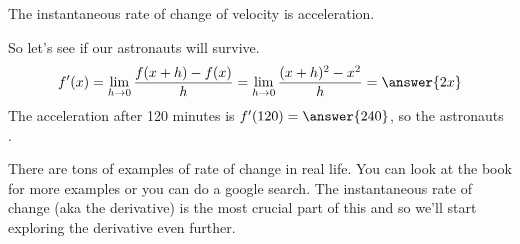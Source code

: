 \documentclass{ximera}
\begin{document}
The instantaneous rate of change of velocity is acceleration.

So let's see if our astronauts will survive.
\[
f^{\prime}(x)=\lim_{h\rightarrow 0}\frac{f(x+h)-f(x)}{h}=\lim_{h\rightarrow 0}\frac{(x+h)^{2}-x^{2}}{h}=\answer{2x}
\]
The acceleration after 120 minutes is $f^{\prime}(120)=\answer{240}$, so the astronauts .

There are tons of examples of rate of change in real life. You can look at the book for more examples or you can do a google search. The instantaneous rate of change (aka the derivative) is the most crucial part of this and so we'll start exploring the derivative even further.
\end{document}
